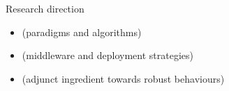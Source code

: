 \begin{frame}{Research direction}
  \begin{cardTiny}
    \centering  
    \textbf{}
  \end{cardTiny}
  \begin{card}
    \begin{itemize}
      \item \textbf{} (paradigms and algorithms)
      \item \textbf{} (middleware and deployment strategies)
      \item \textbf{} (adjunct ingredient towards robust behaviours)
    \end{itemize}
  \end{card}
\end{frame}